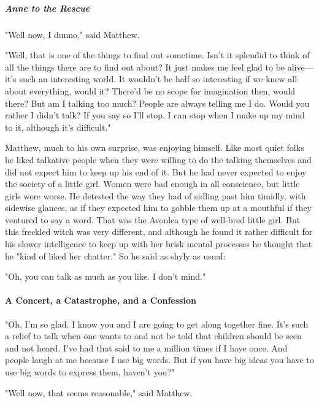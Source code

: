 \documentclass{article}
\begin{document}
\subparagraph{Anne to the Rescue}
"Well now, I dunno," said Matthew.

"Well, that is one of the things to find out sometime. Isn't it splendid to think of all the things there are to find out about? It just makes me feel glad to be alive---it's such an interesting world. It wouldn't be half so interesting if we knew all about everything, would it? There'd be no scope for imagination then, would there? But am I talking too much? People are always telling me I do. Would you rather I didn't talk? If you say so I'll stop. I can stop when I make up my mind to it, although it's difficult."

Matthew, much to his own surprise, was enjoying himself. Like most quiet folks he liked talkative people when they were willing to do the talking themselves and did not expect him to keep up his end of it. But he had never expected to enjoy the society of a little girl. Women were bad enough in all conscience, but little girls were worse. He detested the way they had of sidling past him timidly, with sidewise glances, as if they expected him to gobble them up at a mouthful if they ventured to say a word. That was the Avonlea type of well-bred little girl. But this freckled witch was very different, and although he found it rather difficult for his slower intelligence to keep up with her brisk mental processes he thought that he "kind of liked her chatter." So he said as shyly as usual:

"Oh, you can talk as much as you like. I don't mind."

\paragraph{A Concert, a Catastrophe, and a Confession}
"Oh, I'm so glad. I know you and I are going to get along together fine. It's such a relief to talk when one wants to and not be told that children should be seen and not heard. I've had that said to me a million times if I have once. And people laugh at me because I use big words. But if you have big ideas you have to use big words to express them, haven't you?"

"Well now, that seems reasonable," said Matthew.
\end{document}
